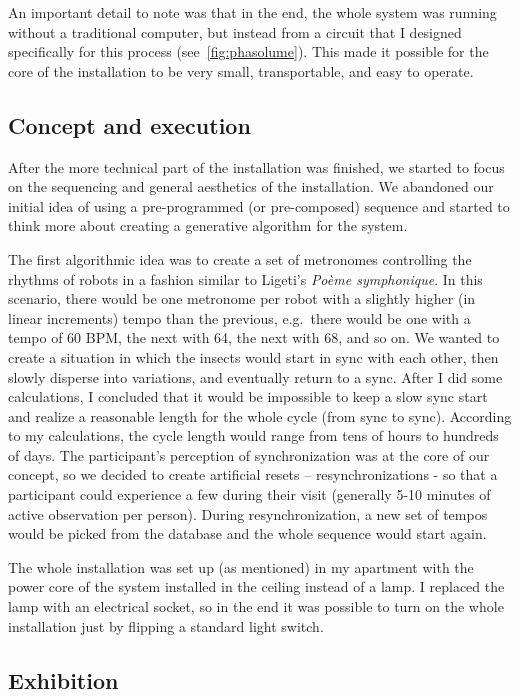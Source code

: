 \documentclass[12pt,a4paper,oneside]{report}
\begin{document}
An important detail to note was that in the end, the whole system was running without a traditional computer, but instead from a circuit that I designed specifically for this process (see~\ref{fig:phasolume}). This made it possible for the core of the installation to be very small, transportable, and easy to operate.

\subsection{Concept and execution}

After the more technical part of the installation was finished, we started to focus on the sequencing and general aesthetics of the installation.  We abandoned our initial idea of using a pre-programmed (or pre-composed) sequence and started to think more about creating a generative algorithm for the system.

The first algorithmic idea was to create a set of metronomes controlling the rhythms of robots in a fashion similar to Ligeti’s \emph{Poème symphonique}. In this scenario, there would be one metronome per robot with a slightly higher (in linear increments) tempo than the previous, e.g.\ there would be one with a tempo of 60 BPM, the next with 64, the next with 68, and so on. We wanted to create a situation in which the insects would start in sync with each other, then slowly disperse into variations, and eventually return to a sync. After I did some calculations, I concluded that it would be impossible to keep a slow sync start and realize a reasonable length for the whole cycle (from sync to sync). According to my calculations, the cycle length would range from tens of hours to hundreds of days. The participant’s perception of synchronization was at the core of our concept, so we decided to create artificial resets – resynchronizations - so that a participant could experience a few during their visit (generally 5-10 minutes of active observation per person). During resynchronization, a new set of tempos would be picked from the database and the whole sequence would start again.

The whole installation was set up (as mentioned) in my apartment with the power core of the system installed in the ceiling instead of a lamp. I replaced the lamp with an electrical socket, so in the end it was possible to turn on the whole installation just by flipping a standard light switch.

\subsection{Exhibition}
\end{document}
